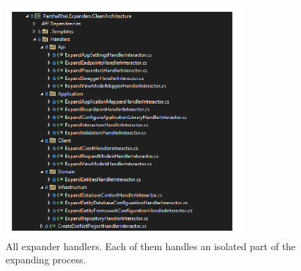 \begin{figure}[H]
    \centering
    \includegraphics[width=0.8\textwidth]{Figures/expander_handlers.pdf}
    \caption[handlers]{All expander handlers. Each of them handles an isolated part of the expanding process.}
    \label{fig:handlers}
\end{figure}